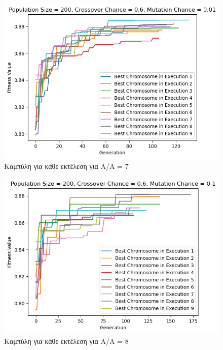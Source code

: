 \documentclass[12pt,a4paper]{article}
\begin{document}
\begin{figure}[H]
	\includegraphics[width=\textwidth]{Figures/14. All for AA = 7.png}
	\caption{Καμπύλη για κάθε εκτέλεση για A/A = 7}
\end{figure}

\begin{figure}[H]
	\includegraphics[width=\textwidth]{Figures/16. All for AA = 8.png}
	\caption{Καμπύλη για κάθε εκτέλεση για A/A = 8}
\end{figure}
\end{document}
